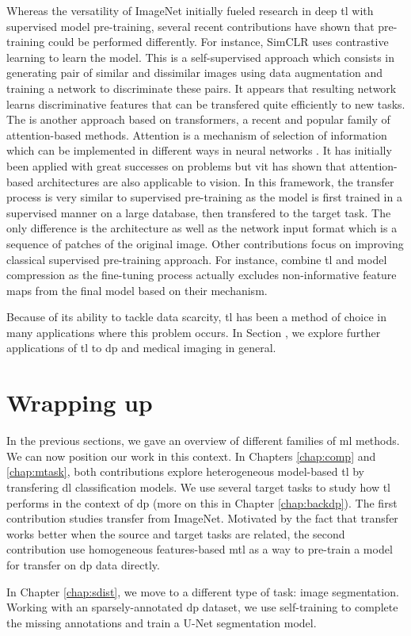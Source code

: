 Whereas the versatility of ImageNet initially fueled research in deep \acrlong{tl} with supervised model pre-training, several recent contributions have shown that pre-training could be performed differently. For instance, SimCLR \parencite{chen2020simple} uses contrastive learning to learn the model. This is a self-supervised approach which consists in generating pair of similar and dissimilar images using data augmentation and training a network to discriminate these pairs. It appears that resulting network learns discriminative features that can be transfered quite efficiently to new tasks. The  \parencite{dosovitskiy2020image} is another approach based on transformers, a recent and popular family of attention-based methods. Attention is a mechanism of selection of information which can be implemented in different ways in neural networks \parencite{niu2021review}. It has initially been applied with great successes on  problems but \acrshort{vit} has shown that attention-based architectures are also applicable to vision. In this framework, the transfer process is very similar to supervised pre-training as the model is first trained in a supervised manner on a large database, then transfered to the target task. The only difference is the architecture as well as the network input format which is a sequence of patches of the original image. Other contributions focus on improving classical supervised pre-training approach. For instance, \parencite{wang2019pay} combine \acrlong{tl} and model compression as the fine-tuning process actually excludes non-informative feature maps from the final model based on their  mechanism.

Because of its ability to tackle data scarcity, \acrlong{tl} has been a method of choice in many applications where this problem occurs. In Section , we explore further applications of \acrlong{tl} to \acrlong{dp} and medical imaging in general.

\section{Wrapping up}

In the previous sections, we gave an overview of different families of \acrlong{ml} methods. We can now position our work in this context. In Chapters \ref{chap:comp} and \ref{chap:mtask}, both contributions explore heterogeneous model-based \acrlong{tl} by transfering \acrlong{dl} classification models. We use several target tasks to study how \acrlong{tl} performs in the context of \acrlong{dp} (more on this in Chapter \ref{chap:backdp}). The first contribution studies transfer from ImageNet. Motivated by the fact that transfer works better when the source and target tasks are related, the second contribution use homogeneous features-based \acrlong{mtl} as a way to pre-train a model for transfer on \acrlong{dp} data directly.

In Chapter \ref{chap:sdist}, we move to a different type of task: image segmentation. Working with an sparsely-annotated \acrlong{dp} dataset, we use self-training to complete the missing annotations and train a U-Net segmentation model.

